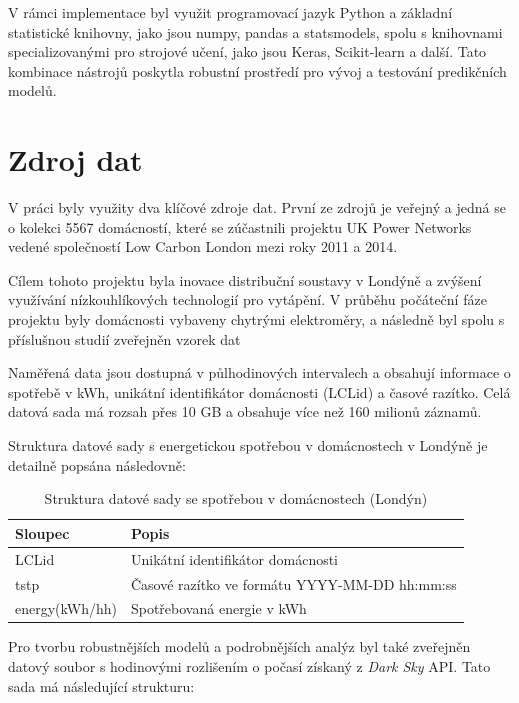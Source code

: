 \documentclass[FM,BP,fonts]{tulthesis}
\begin{document}
V rámci implementace byl využit programovací jazyk Python a základní statistické knihovny, jako jsou numpy, pandas a statsmodels, spolu s knihovnami specializovanými pro strojové učení, jako jsou Keras, Scikit-learn a další. Tato kombinace nástrojů poskytla robustní prostředí pro vývoj a testování predikčních modelů.

\newpage
\section{Zdroj dat}
V práci byly využity dva klíčové zdroje dat. První ze zdrojů je veřejný a jedná se o kolekci 5567 domácností, které se zúčastnili projektu UK Power Networks vedené společností Low Carbon London mezi roky 2011 a 2014. 

Cílem tohoto projektu byla inovace distribuční soustavy v Londýně a zvýšení využívání nízkouhlíkových technologií pro vytápění. V průběhu počáteční fáze projektu byly domácnosti vybaveny chytrými elektroměry, a následně byl spolu s příslušnou studií zveřejněn vzorek dat \cite{londondata}

Naměřená data jsou dostupná v půlhodinových intervalech a obsahují informace o spotřebě v kWh, unikátní identifikátor domácnosti (LCLid) a časové razítko. Celá datová sada má rozsah přes 10 GB a obsahuje více než 160 milionů záznamů.

Struktura datové sady s energetickou spotřebou v domácnostech v Londýně je detailně popsána následovně:
 \renewcommand{\arraystretch}{1.1}
\begin{table}[!ht]
	\centering
	\caption{Struktura datové sady se spotřebou v domácnostech (Londýn)}
	\begin{tabularx}{\linewidth}{ll}
		\hline
		\textbf{Sloupec} & \textbf{Popis} \\ \hline
		LCLid & Unikátní identifikátor domácnosti \\ 
		tstp & Časové razítko ve formátu YYYY-MM-DD hh:mm:ss \\ 
		energy(kWh/hh) & Spotřebovaná energie v kWh \\ 
		\hline
	\end{tabularx}
\end{table}

Pro tvorbu robustnějších modelů a podrobnějších analýz byl také zveřejněn datový soubor s hodinovými rozlišením o počasí získaný z \textit{Dark Sky} API. Tato sada má následující strukturu:
\end{document}
